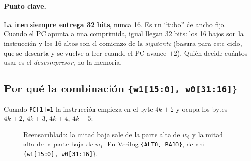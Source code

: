 \documentclass[11pt]{article}
\newcommand{\code}[1]{\texttt{#1}}
\begin{document}
\paragraph{Punto clave.} La \code{imem} \textbf{siempre entrega 32 bits}, nunca
16. Es un ``tubo'' de ancho fijo. Cuando el PC apunta a una comprimida, igual
llegan 32 bits: los 16 bajos son la instrucción y los 16 altos son el comienzo de
la \emph{siguiente} (basura para este ciclo, que se descarta y se vuelve a leer
cuando el PC avance $+2$). Quién decide cuántos usar es el \emph{descompresor}, no
la memoria.

\subsection{Por qué la combinación \texttt{\{w1[15:0], w0[31:16]\}}}

Cuando \code{PC[1]=1} la instrucción empieza en el byte $4k{+}2$ y ocupa los
bytes $4k{+}2,\,4k{+}3,\,4k{+}4,\,4k{+}5$:

\begin{figure}[H]
\centering
{}
\caption{Reensamblado: la mitad baja sale de la parte alta de $w_0$ y la mitad
alta de la parte baja de $w_1$. En Verilog \code{\{ALTO, BAJO\}}, de ahí
\code{\{w1[15:0], w0[31:16]\}}.}
\label{fig:ventana}
\end{figure}
\end{document}
